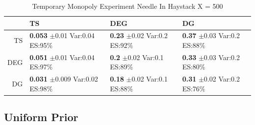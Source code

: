 \documentclass[11pt,letterpaper]{article}
\begin{document}
\begin{table}[H]
\centering
\caption{Temporary Monopoly Experiment Needle In Haystack X = 500} 
\begin{tabular}{rlll}
  \hline
 & TS & DEG &  DG \\ 
  \hline
TS & \makecell{\textbf{0.053} $\pm$0.01\\Var:0.04\\ES:95\%} & \makecell{\textbf{0.23} $\pm$0.02\\Var:0.2\\ES:92\%} & \makecell{\textbf{0.37} $\pm$0.03\\Var:0.2\\ES:88\%} \\ 
  DEG & \makecell{\textbf{0.051} $\pm$0.01\\Var:0.04\\ES:97\%} & \makecell{\textbf{0.2} $\pm$0.02\\Var:0.1\\ES:89\%} & \makecell{\textbf{0.33} $\pm$0.03\\Var:0.2\\ES:80\%} \\ 
   DG & \makecell{\textbf{0.031} $\pm$0.009\\Var:0.02\\ES:98\%} & \makecell{\textbf{0.18} $\pm$0.02\\Var:0.1\\ES:88\%} & \makecell{\textbf{0.31} $\pm$0.02\\Var:0.2\\ES:76\%} \\ 
   \hline
\end{tabular}
\end{table}


\subsection*{Uniform Prior}
\end{document}
